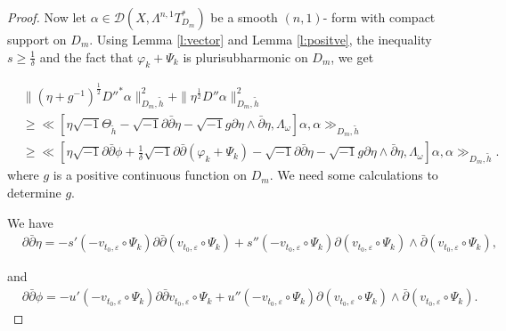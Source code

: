 \begin{proof}
Now let $\alpha\in \mathcal{D}(X,\Lambda^{n,1}T_{D_{m}}^{*})$ be a
smooth $(n,1)$- form with compact support on $D_{m}$. Using Lemma
\ref{l:vector} and Lemma \ref{l:positve}, the inequality $s\geq
\frac{1}{\delta}$ and the fact that $\varphi_{k}+\Psi_{k}$ is
plurisubharmonic on $D_{m}$, we get

\begin{equation}
\label{equ:10.1}
\begin{split}
&\|(\eta+g^{-1})^{\frac{1}{2}}D''^{*}\alpha\|^{2}_{D_{m},\tilde{h}}
+\|\eta^{\frac{1}{2}}D''\alpha\|^{2}_{D_{m},\tilde{h}}
\\&\geq\ll[\eta\sqrt{-1}\Theta_{\tilde{h}}-\sqrt{-1}\partial\bar\partial\eta-
\sqrt{-1}g\partial\eta\wedge\bar\partial\eta,\Lambda_{\omega}]\alpha,\alpha\gg_{D_{m},\tilde{h}}
\\&\geq\ll[\eta\sqrt{-1}\partial\bar\partial\phi+\frac{1}
{\delta}\sqrt{-1}\partial\bar\partial(\varphi_{k}+\Psi_{k})-\sqrt{-1}\partial\bar\partial\eta-
\sqrt{-1}g\partial\eta\wedge\bar\partial\eta,\Lambda_{\omega}]\alpha,\alpha\gg_{D_{m},\tilde{h}}.
\end{split}
\end{equation}
where $g$ is a positive continuous function on $D_{m}$.
We need some calculations to determine $g$.

We have
\begin{equation}
\label{}
\begin{split}
&\partial\bar{\partial}\eta=
-s'(-v_{t_0,\varepsilon}\circ \Psi_{k})\partial\bar{\partial}(v_{t_0,\varepsilon}\circ \Psi_{k})
+s''(-v_{t_0,\varepsilon}\circ \Psi_{k})\partial(v_{t_0,\varepsilon}\circ \Psi_{k})\wedge
\bar{\partial}(v_{t_0,\varepsilon}\circ \Psi_{k}),
\end{split}
\end{equation}

and
\begin{equation}
\label{}
\begin{split}
&\partial\bar{\partial}\phi=
-u'(-v_{t_0,\varepsilon}\circ \Psi_{k})\partial\bar{\partial}v_{t_0,\varepsilon}\circ \Psi_{k}
+
u''(-v_{t_0,\varepsilon}\circ \Psi_{k})\partial(v_{t_0,\varepsilon}\circ \Psi_{k})
\wedge\bar{\partial}(v_{t_0,\varepsilon}\circ \Psi_{k}).
\end{split}
\end{equation}


\end{proof}
